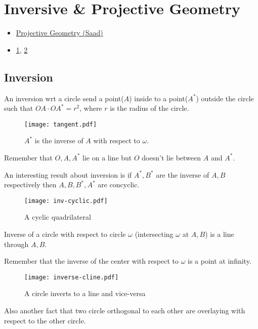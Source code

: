 \newcommand{\astt}{^{\ast}}

\chapter{Inversive \& Projective Geometry}%

\begin{linkb}
   \begin{itemize}
        \item \href{https://www.youtube.com/watch?v=P4FN_-LOEx4}{Projective Geometry (Saad)}
        \item \href{https://drive.google.com/file/d/1MfmQFOs-N120PnhCfIheByLBQKbua9Jl/view}{1}, \href{https://drive.google.com/file/d/14VtTlUP3GvV1vjV_Njt5o0TbSzBvfE0-/view}{2}
   \end{itemize}
\end{linkb}

\section{Inversion}
An inversion wrt a circle send a point($A$) inside to a point($A\astt$) outside the circle such that $OA\cdot OA\astt =r^2$,
where $r$ is the radius of the circle.
\begin{figure}[ht]
\centering
	\texttt{[image: tangent.pdf]}%
	\caption{$A\astt$ is the inverse of $A$ with respect to $\omega$.}
\end{figure}
Remember that $O,A,A\astt$ lie on a line but $O$ doesn't lie between $A$ and $A\astt$.

An interesting result about inversion is if $A\astt, B\astt$ are the inverse of $A,B$ respectively then $A,B,B\astt, A\astt$ are concyclic.
\begin{figure}[h!t]
\centering
	\texttt{[image: inv-cyclic.pdf]}%
	\caption{A cyclic quadrilateral}
\end{figure}


Inverse of a circle with respect to circle $\omega$ (intersecting $\omega$ at $A,B$) is a line through $A,B$.

Remember that the inverse of the center with respect to $\omega$ is a point at infinity.

\begin{figure}[h!t]
\centering
	\texttt{[image: inverse-cline.pdf]}%
	\caption{A circle inverts to a line and vice-versa}
\end{figure}
Also another fact that two circle orthogonal to each other are overlaying with respect to the other circle.

